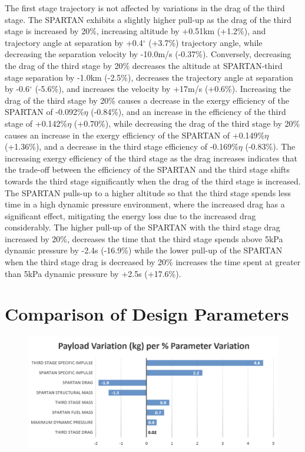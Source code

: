 The first stage trajectory is not affected by variations in the drag of the third stage. 
The SPARTAN exhibits a slightly higher pull-up as the drag of the third stage is increased by 20\%, increasing altitude by +0.51km (+1.2\%), and trajectory angle at separation by +0.4$^\circ$ (+3.7\%) trajectory angle, while decreasing the separation velocity by -10.0m/s (-0.37\%). Conversely, decreasing the drag of the third stage by 20\% decreases the altitude at SPARTAN-third stage separation by -1.0km (-2.5\%), decreases the trajectory angle at separation by -0.6$^\circ$ (-5.6\%), and increases the velocity by +17m/s (+0.6\%). 
Increasing the drag of the third stage by 20\% causes a decrease in the exergy efficiency of the SPARTAN of -0.092\%$\eta$ (-0.84\%), and an increase in the efficiency of the third stage of +0.142\%$\eta$ (+0.70\%), while decreasing the drag of the third stage by 20\% causes an increase in the exergy efficiency of the SPARTAN of +0.149\%$\eta$ (+1.36\%), and a decrease in the third stage efficiency of -0.169\%$\eta$ (-0.83\%). The increasing exergy efficiency of the third stage as the drag increases indicates that the trade-off between the efficiency of the SPARTAN and the third stage shifts towards the third stage significantly when the drag of the third stage is increased. The SPARTAN pulls-up to a higher altitude so that the third stage spends less time in a high dynamic pressure environment, where the increased drag has a significant effect, mitigating the energy loss due to the increased drag considerably. The higher pull-up of the SPARTAN with the third stage drag increased by 20\%, decreases the time that the third stage spends above 5kPa dynamic pressure by -2.4s (-16.9\%) while the lower pull-up of the SPARTAN when the third stage drag is decreased by 20\% increases the time spent at greater than 5kPa dynamic pressure by +2.5s (+17.6\%).

\section{Comparison of Design Parameters}\label{sec:comparisonNoReturn}

\begin{figure}[ht!]
	\centering
	\includegraphics[width=0.99\linewidth]{figures/5_Ascent/BarChartRelativePayloadChange}
	\caption{}
	\label{fig:BarChartRelativePayloadChange}
\end{figure}

